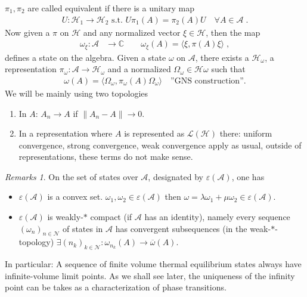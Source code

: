 \documentclass[
a4paper, %
11pt, %
onecolumn, %
openany, %
]{memoir}
\theoremstyle{definition}
\theoremstyle{remark}
\newtheorem{remarks}{Remarks}[chapter]
\theoremstyle{plain}
\begin{document}
$\pi_1,\pi_2$ are called equivalent if there is a unitary map \begin{align}
U:\mathcal{H}_1\rightarrow \mathcal{H}_2 \text{ s.t. } U\pi_1(A)=\pi_2(A)U\quad \forall A\in \mathcal{A}\; .
\end{align}
Now given a $\pi$ on $\mathcal{H}$ and any normalized vector $\xi\in\mathcal{H}$, then the map \begin{align}
\omega_{\xi}:\mathcal{A}&\longrightarrow \mathbb{C}\qquad \omega_{\xi}(A)=\langle\xi,\pi(A)\xi\rangle \; ,
\end{align}
defines a state on the algebra. Given a state $\omega$ on $\mathcal{A}$, there exists a $\mathcal{H}_\omega$, a representation $\pi_{\omega}:\mathcal{A}\rightarrow \mathcal{H}_\omega$ and a normalized $\Omega_{\omega}\in\mathcal{H}\omega$ such that \begin{align}
\omega(A)=\langle\Omega_{\omega},\pi_{\omega}(A)\Omega_{\omega}\rangle \quad \text{''GNS construction''.}
\end{align}
We will be mainly using two topologies \begin{enumerate}
	\item In $A$: $A_n\rightarrow A$ if $\|A_n-A\|\rightarrow 0$. 
	\item In a representation where $A$ is represented as $\mathcal{L}(\mathcal{H})$ there: uniform convergence, strong convergence, weak convergence apply as usual, outside of representations, these terms do not make sense.
\end{enumerate}
\begin{remarks}
	On the set of states over $\mathcal{A}$, designated by $\varepsilon(\mathcal{A})$, one has \begin{itemize}
		\item $\varepsilon(\mathcal{A})$ is a convex set. $\omega_1,\omega_2\in\varepsilon(\mathcal{A})$ then $\omega=\lambda\omega_1+\mu\omega_2\in\varepsilon(\mathcal{A})$.
		\item $\varepsilon(\mathcal{A})$ is weakly-$*$ compact (if $\mathcal{A}$ has an identity), namely every sequence $(\omega_n)_{n\in\mathcal{N}}$ of states in $\mathcal{A}$ has convergent subsequences (in the weak-$*$-topology) $\exists(n_k)_{k\in\mathcal{N}}:\omega_{n_k}(A)\rightarrow \overline{\omega}(A)$.
	\end{itemize}
In particular: A sequence of finite volume thermal equilibrium states always have infinite-volume limit points. As we shall see later, the uniqueness of the infinity point can be takes as a characterization of phase transitions.
\end{remarks}
\end{document}
